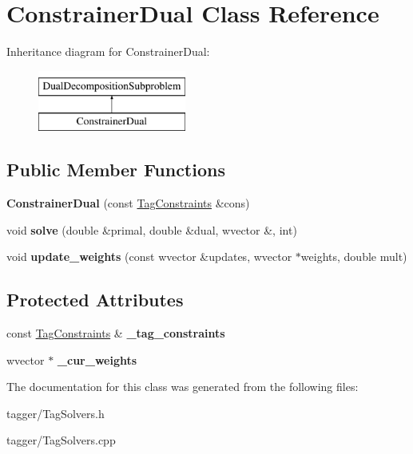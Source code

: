 \hypertarget{class_constrainer_dual}{
\section{ConstrainerDual Class Reference}
\label{class_constrainer_dual}
}
Inheritance diagram for ConstrainerDual:\begin{figure}[H]
\begin{center}
\leavevmode
\includegraphics[height=2cm]{class_constrainer_dual}
\end{center}
\end{figure}
\subsection*{Public Member Functions}
\begin{DoxyCompactItemize}
\item 
\hypertarget{class_constrainer_dual_ae74adbb392415eec3451dd5a20820b6b}{
{\bfseries ConstrainerDual} (const \hyperlink{class_tag_constraints}{TagConstraints} \&cons)}
\label{class_constrainer_dual_ae74adbb392415eec3451dd5a20820b6b}

\item 
\hypertarget{class_constrainer_dual_a8cd72c1288fc93a0fec014095ac7252b}{
void {\bfseries solve} (double \&primal, double \&dual, wvector \&, int)}
\label{class_constrainer_dual_a8cd72c1288fc93a0fec014095ac7252b}

\item 
\hypertarget{class_constrainer_dual_a622b99f704a3324133f08521eb4924f5}{
void {\bfseries update\_\-weights} (const wvector \&updates, wvector $\ast$weights, double mult)}
\label{class_constrainer_dual_a622b99f704a3324133f08521eb4924f5}

\end{DoxyCompactItemize}
\subsection*{Protected Attributes}
\begin{DoxyCompactItemize}
\item 
\hypertarget{class_constrainer_dual_abda18ff85d425d3748f49709534ec9ea}{
const \hyperlink{class_tag_constraints}{TagConstraints} \& {\bfseries \_\-tag\_\-constraints}}
\label{class_constrainer_dual_abda18ff85d425d3748f49709534ec9ea}

\item 
\hypertarget{class_constrainer_dual_a4dd6e580712c0b35da77e42e137c7274}{
wvector $\ast$ {\bfseries \_\-cur\_\-weights}}
\label{class_constrainer_dual_a4dd6e580712c0b35da77e42e137c7274}

\end{DoxyCompactItemize}


The documentation for this class was generated from the following files:\begin{DoxyCompactItemize}
\item 
tagger/TagSolvers.h\item 
tagger/TagSolvers.cpp\end{DoxyCompactItemize}
